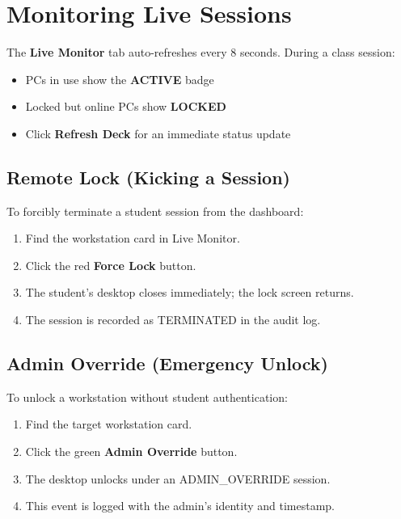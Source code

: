 \section{Monitoring Live Sessions}

The \textbf{Live Monitor} tab auto-refreshes every 8 seconds. During a class session:

\begin{itemize}[label={\textcolor{aurxonblue}{\faEye}}]
  \item PCs in use show the \textcolor{aurxongreen}{\textbf{ACTIVE}} badge
  \item Locked but online PCs show \textcolor{aurxonamber}{\textbf{LOCKED}}
  \item Click \textbf{Refresh Deck} for an immediate status update
\end{itemize}

\subsection{Remote Lock (Kicking a Session)}

To forcibly terminate a student session from the dashboard:

\begin{enumerate}[leftmargin=*, label=\textbf{\arabic*.}]
  \item Find the workstation card in Live Monitor.
  \item Click the red \textbf{Force Lock} button.
  \item The student's desktop closes immediately; the lock screen returns.
  \item The session is recorded as TERMINATED in the audit log.
\end{enumerate}

\subsection{Admin Override (Emergency Unlock)}

To unlock a workstation without student authentication:

\begin{enumerate}[leftmargin=*, label=\textbf{\arabic*.}]
  \item Find the target workstation card.
  \item Click the green \textbf{Admin Override} button.
  \item The desktop unlocks under an ADMIN\_OVERRIDE session.
  \item This event is logged with the admin's identity and timestamp.
\end{enumerate}

